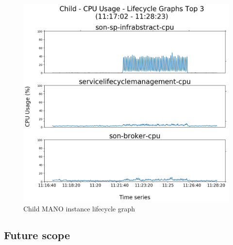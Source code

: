 \begin{figure}
	\centering
	\includegraphics[width=0.65\linewidth]{figures/scalability_graphs/Scalability-Evaluation/Child-TOP-3-Lifecycle}
	\caption{Child MANO instance lifecycle graph}
	\label{fig:child-top-3-lifecycle}
\end{figure}



\subsection{Future scope}
